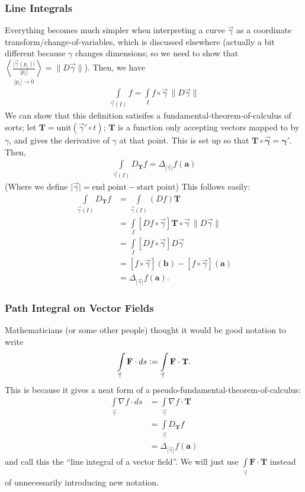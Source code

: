 \documentclass{article}
\newcommand{\lv}[1]{\lvert #1\rvert}
\newcommand{\lV}[1]{\lVert #1\rVert}
\newcommand{\seq}[2]{\underset{#2}{\left\langle #1\right\rangle}}
\newcommand{\vc}{\vcentcolon}
\theoremstyle{definition}
\begin{document}
\newpage
\subsubsection{Line Integrals}
Everything becomes much simpler when interpreting a curve $\vec\gamma$ as a coordinate transform/change-of-variables, which is discussed elsewhere (actually a bit different because $\gamma$ changes dimensions; so we need to show that $\seq{\frac{\lv{\vec\gamma(p_i)}}{\lv{p_i}}}{\lv{p_i}\rightarrow0}=\lV{D\vec\gamma}$). Then, we have
\begin{align*}
	\int\limits_{\vec\gamma(I)}f=\int\limits_If\circ\vec\gamma\,\lV{D\vec\gamma}
\end{align*}
We can show that this definition satisifes a fundamental-theorem-of-calculus of sorts; let $\mathbf{T}=\text{unit}(\vec\gamma'\circ t)$; $\mathbf{T}$ is a function only accepting vectors mapped to by $\gamma$, and gives the derivative of $\gamma$ at that point. This is set up so that $\mathbf{T\circ\vec\gamma=\gamma'}$. Then,
\begin{align*}
	\int\limits_{\vec\gamma(I)}D_{\mathbf{T}}f=\Delta_{\lv{\vec\gamma}}f(\mathbf{a})
\end{align*}
(Where we define $\lv{\vec\gamma}=\text{end point}-\text{start point}$)
This follows easily:
\begin{align*}
	\int\limits_{\vec\gamma(I)}D_{\mathbf{T}}f&=\int\limits_{\vec\gamma(I)}(Df)\mathbf{T}\\
	&=\int\limits_I[Df\circ\vec\gamma]\mathbf{T}\circ\vec\gamma\,\lV{D\vec\gamma}\\
	&=\int\limits_I[Df\circ\vec\gamma]D\vec\gamma\\
	&=[f\circ\vec\gamma](\mathbf{b})-[f\circ\vec\gamma](\mathbf{a})\\
	&=\Delta_{\lv{\vec\gamma}}f(\mathbf{a}).
\end{align*}


\subsubsection{Path Integral on Vector Fields}
Mathematicians (or some other people) thought it would be good notation to write
\begin{align*}
	\int\limits_{\vec\gamma}\mathbf{F}\cdot ds\vc=\int\limits_{\vec\gamma}\mathbf{F}\cdot\mathbf{T}.
\end{align*}
This is because it gives a neat form of a pseudo-fundamental-theorem-of-calculus:
\begin{align*}
	\int\limits_{\vec\gamma}\nabla f\cdot ds&=\int\limits_{\vec\gamma}\nabla f\cdot\mathbf{T}\\
	&=\int\limits_{\vec\gamma}D_{\mathbf{T}}f\\
	&=\Delta_{\lv{\vec\gamma}}f(\mathbf{a})
\end{align*}
and call this the ``line integral of a vector field''. We will just use $\int\limits_{\vec\gamma}\mathbf{F}\cdot\mathbf{T}$ instead of unnecessarily introducing new notation.
\end{document}
